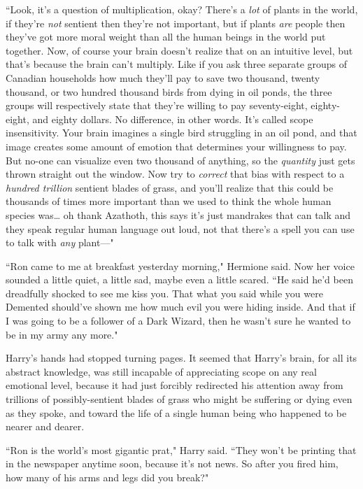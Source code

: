 ``Look, it's a question of multiplication, okay? There's a \emph{lot} of plants in the world, if they're \emph{not} sentient then they're not important, but if plants \emph{are} people then they've got more moral weight than all the human beings in the world put together. Now, of course your brain doesn't realize that on an intuitive level, but that's because the brain can't multiply. Like if you ask three separate groups of Canadian households how much they'll pay to save two thousand, twenty thousand, or two hundred thousand birds from dying in oil ponds, the three groups will respectively state that they're willing to pay seventy-eight, eighty-eight, and eighty dollars. No difference, in other words. It's called scope insensitivity. Your brain imagines a single bird struggling in an oil pond, and that image creates some amount of emotion that determines your willingness to pay. But no-one can visualize even two thousand of anything, so the \emph{quantity} just gets thrown straight out the window. Now try to \emph{correct} that bias with respect to a \emph{hundred trillion} sentient blades of grass, and you'll realize that this could be thousands of times more important than we used to think the whole human species was{\ldots} oh thank Azathoth, this says it's just mandrakes that can talk and they speak regular human language out loud, not that there's a spell you can use to talk with \emph{any} plant—"

``Ron came to me at breakfast yesterday morning," Hermione said. Now her voice sounded a little quiet, a little sad, maybe even a little scared. ``He said he'd been dreadfully shocked to see me kiss you. That what you said while you were Demented should've shown me how much evil you were hiding inside. And that if I was going to be a follower of a Dark Wizard, then he wasn't sure he wanted to be in my army any more."

Harry's hands had stopped turning pages. It seemed that Harry's brain, for all its abstract knowledge, was still incapable of appreciating scope on any real emotional level, because it had just forcibly redirected his attention away from trillions of possibly-sentient blades of grass who might be suffering or dying even as they spoke, and toward the life of a single human being who happened to be nearer and dearer.

``Ron is the world's most gigantic prat," Harry said. ``They won't be printing that in the newspaper anytime soon, because it's not news. So after you fired him, how many of his arms and legs did you break?"

